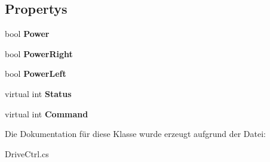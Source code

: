 \subsection*{Propertys}
\begin{DoxyCompactItemize}
\item 
\hypertarget{class_robot_ctrl_1_1_drive_ctrl_aef1505229ec4f37b5cc69377360c3f2a}{
bool {\bfseries Power}}
\label{class_robot_ctrl_1_1_drive_ctrl_aef1505229ec4f37b5cc69377360c3f2a}

\item 
\hypertarget{class_robot_ctrl_1_1_drive_ctrl_a7fa4a69b83012c16657c9f88a0637754}{
bool {\bfseries PowerRight}}
\label{class_robot_ctrl_1_1_drive_ctrl_a7fa4a69b83012c16657c9f88a0637754}

\item 
\hypertarget{class_robot_ctrl_1_1_drive_ctrl_af59bc9fd9c92f7bae49654588693673a}{
bool {\bfseries PowerLeft}}
\label{class_robot_ctrl_1_1_drive_ctrl_af59bc9fd9c92f7bae49654588693673a}

\item 
\hypertarget{class_robot_ctrl_1_1_drive_ctrl_a462a4b74b24efb494df863d1ac249b45}{
virtual int {\bfseries Status}}
\label{class_robot_ctrl_1_1_drive_ctrl_a462a4b74b24efb494df863d1ac249b45}

\item 
\hypertarget{class_robot_ctrl_1_1_drive_ctrl_a45359565bdcb6293ed723acb48cae18b}{
virtual int {\bfseries Command}}
\label{class_robot_ctrl_1_1_drive_ctrl_a45359565bdcb6293ed723acb48cae18b}

\end{DoxyCompactItemize}


Die Dokumentation für diese Klasse wurde erzeugt aufgrund der Datei:\begin{DoxyCompactItemize}
\item 
DriveCtrl.cs\end{DoxyCompactItemize}
